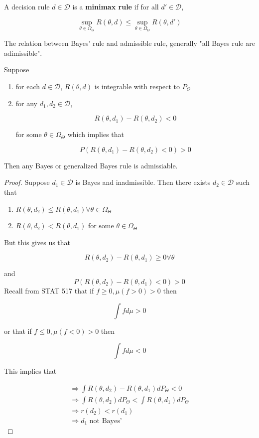 \documentclass[11pt,fleqn]{book} %
\begin{document}
\begin{definition}
	A decision rule $d\in \mathcal{D}$ is a \textbf{minimax rule} if for all $d' \in \mathcal{D}$, 

			$$\sup_{\theta \in \Omega_\Theta} R(\theta, d) \leq \sup_{\theta \in \Omega_\Theta} R(\theta, d')$$
\end{definition}

The relation between Bayes' rule and admissible rule, generally "all Bayes rule are adimissible". 

\begin{theorem}[1.8 in Notes]

Suppose 

	\begin{enumerate}
		\item for each $d \in \mathcal{D}$, $R(\theta, d)$ is integrable with respect to $P_\Theta$ 
		\item for any $d_1, d_2 \in \mathcal{D}$, 

				$$R(\theta, d_1) - R(\theta, d_2) < 0 $$

		for some $\theta \in \Omega_\Theta$ which implies that

				$$P(R(\theta, d_1) - R(\theta, d_2) < 0 ) > 0$$
	\end{enumerate}

Then any Bayes or generalized Bayes rule is admissiable. 


\end{theorem}

\begin{proof}
	Suppose $d_1 \in \mathcal{D}$ is Bayes and inadmissible. Then there exists $d_2 \in \mathcal{D}$ such that

		\begin{enumerate}
			\item $R(\theta, d_2) \leq R(\theta, d_1) \forall \theta \in \Omega_\Theta$
			\item  $R(\theta, d_2) < R(\theta, d_1) \text{ for some } \theta \in \Omega_\Theta$
		\end{enumerate}

But this gives us that 

		$$R(\theta, d_2) - R(\theta, d_1) \geq 0  \forall \theta$$

		and
			$$P(R(\theta, d_2) - R(\theta, d_1) < 0 ) > 0$$
Recall from STAT 517 that if $f \geq 0, \mu(f> 0) > 0$ then 
		
				$$\int f d\mu > 0 $$

	or that  if $f \leq 0, \mu(f< 0) > 0$ then

			$$\int f d\mu < 0  $$

	This implies that 

		\begin{align*}
			\Rightarrow \int R(\theta, d_2) - R(\theta, d_1) d P_\Theta < 0\\
			\Rightarrow \int R(\theta, d_2)d P_\Theta < \int R(\theta, d_1) d P_\Theta\\
			\Rightarrow r(d_2) < r(d_1)\\
			\Rightarrow d_1 \text{ not Bayes'}
			\end{align*}

\end{proof}
\end{document}
